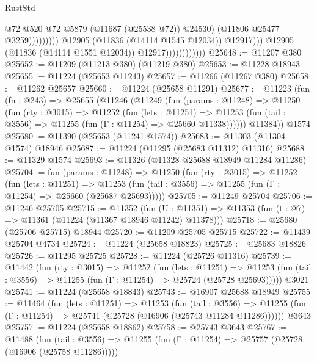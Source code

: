 \begin{lexlean}{RustStd}
\begin{coremodule}
                                                    @72
                                                    @520
                                                    @72
                                                    @5879
                                                    (@11687 (@25538 @72))
                                                    @24530)
                                                  (@11806 @25477 @3259)))))))))
                                  @12905
                                  (@11836 (@14114 @1545 @12034))
                                  @12917)))
                            @12905
                            (@11836 (@14114 @1551 @12034))
                            @12917))))))))))))
@25648 := @11207 @380
@25652 := @11209 (@11213 @380) (@11219 @380)
@25653 := @11228 @18943
@25655 := @11224 (@25653 @11243)
@25657 := @11266 (@11267 @380)
@25658 := @11262 @25657
@25660 := @11224 (@25658 @11291)
@25677 := @11223
    (fun (fn : @243) =>
    @25655
      (@11246
        (@11249
          (fun (params : @11248) =>
          @11250
            (fun (rty : @3015) =>
            @11252
              (fun (lets : @11251) =>
              @11253 (fun (tail : @3556) => @11255 (fun (Γ : @11254) => @25660 @11338))))))
        @11384))
    @1574
@25680 := @11390 (@25653 (@11241 @1574))
@25683 := @11303 (@11304 @1574) @18946
@25687 := @11224 (@11295 (@25683 @11312) @11316)
@25688 := @11329 @1574
@25693 := @11326 (@11328 @25688 @18949 @11284 @11286)
@25704 := fun (params : @11248) =>
  @11250
    (fun (rty : @3015) =>
    @11252
      (fun (lets : @11251) =>
      @11253 (fun (tail : @3556) => @11255 (fun (Γ : @11254) => @25660 (@25687 @25693)))))
@25705 := @11249 @25704
@25706 := @11246 @25705
@25715 := @11352
    (fun (U : @11351) => @11353 (fun (t : @7) => @11361 (@11224 (@11367 @18946 @11242) @11378)))
@25718 := @25680 (@25706 @25715) @18944
@25720 := @11209 @25705 @25715
@25722 := @11439 @25704 @4734
@25724 := @11224 (@25658 @18823)
@25725 := @25683 @18826
@25726 := @11295 @25725
@25728 := @11224 (@25726 @11316)
@25739 := @11442
    (fun (rty : @3015) =>
    @11252
      (fun (lets : @11251) =>
      @11253 (fun (tail : @3556) => @11255 (fun (Γ : @11254) => @25724 (@25728 @25693)))))
    @3021
@25741 := @11224 (@25658 @18843)
@25743 := @16907 @25688 @18949
@25755 := @11464
    (fun (lets : @11251) =>
    @11253
      (fun (tail : @3556) =>
      @11255 (fun (Γ : @11254) => @25741 (@25728 (@16906 (@25743 @11284 @11286))))))
    @3643
@25757 := @11224 (@25658 @18862)
@25758 := @25743 @3643
@25767 := @11488
    (fun (tail : @3556) => @11255 (fun (Γ : @11254) => @25757 (@25728 (@16906 (@25758 @11286)))))

\end{coremodule}
\end{lexlean}
